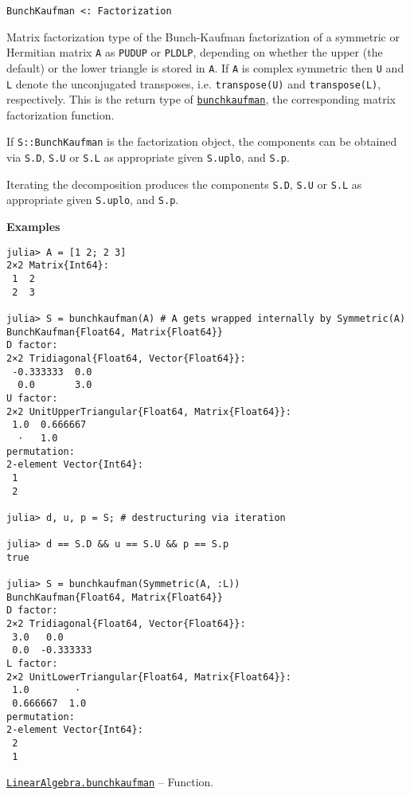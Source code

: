 \begin{adjustwidth}{2em}{0pt}


\begin{verbatim}
BunchKaufman <: Factorization
\end{verbatim}

Matrix factorization type of the Bunch-Kaufman factorization of a symmetric or Hermitian matrix \texttt{A} as \texttt{P{\textquotesingle}UDU{\textquotesingle}P} or \texttt{P{\textquotesingle}LDL{\textquotesingle}P}, depending on whether the upper (the default) or the lower triangle is stored in \texttt{A}. If \texttt{A} is complex symmetric then \texttt{U{\textquotesingle}} and \texttt{L{\textquotesingle}} denote the unconjugated transposes, i.e. \texttt{transpose(U)} and \texttt{transpose(L)}, respectively. This is the return type of \hyperlink{17253210517333433448}{\texttt{bunchkaufman}}, the corresponding matrix factorization function.

If \texttt{S::BunchKaufman} is the factorization object, the components can be obtained via \texttt{S.D}, \texttt{S.U} or \texttt{S.L} as appropriate given \texttt{S.uplo}, and \texttt{S.p}.

Iterating the decomposition produces the components \texttt{S.D}, \texttt{S.U} or \texttt{S.L} as appropriate given \texttt{S.uplo}, and \texttt{S.p}.

\textbf{Examples}


\begin{verbatim}
julia> A = [1 2; 2 3]
2×2 Matrix{Int64}:
 1  2
 2  3

julia> S = bunchkaufman(A) # A gets wrapped internally by Symmetric(A)
BunchKaufman{Float64, Matrix{Float64}}
D factor:
2×2 Tridiagonal{Float64, Vector{Float64}}:
 -0.333333  0.0
  0.0       3.0
U factor:
2×2 UnitUpperTriangular{Float64, Matrix{Float64}}:
 1.0  0.666667
  ⋅   1.0
permutation:
2-element Vector{Int64}:
 1
 2

julia> d, u, p = S; # destructuring via iteration

julia> d == S.D && u == S.U && p == S.p
true

julia> S = bunchkaufman(Symmetric(A, :L))
BunchKaufman{Float64, Matrix{Float64}}
D factor:
2×2 Tridiagonal{Float64, Vector{Float64}}:
 3.0   0.0
 0.0  -0.333333
L factor:
2×2 UnitLowerTriangular{Float64, Matrix{Float64}}:
 1.0        ⋅
 0.666667  1.0
permutation:
2-element Vector{Int64}:
 2
 1
\end{verbatim}



\end{adjustwidth}
\hypertarget{17253210517333433448}{}
\hyperlink{17253210517333433448}{\texttt{LinearAlgebra.bunchkaufman}}  -- {Function.}

